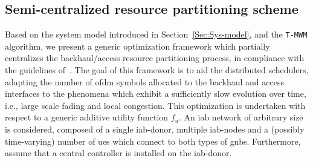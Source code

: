 \subsection{Semi-centralized resource partitioning scheme}
\label{Sec:Cent-scheme}
Based on the system model introduced in Section~\ref{Sec:Sys-model}, and the \texttt{T-MWM} algorithm, we present a generic optimization framework which partially centralizes the backhaul/access resource partitioning process, in compliance with the guidelines of~\cite{3gpp_38_874}. 
The goal of this framework is to aid the distributed schedulers, adapting the number of \gls{ofdm} symbols allocated to the backhaul and access interfaces to the phenomena which exhibit a sufficiently slow evolution over time, i.e., large scale fading and local congestion. %
This optimization is undertaken with respect to a generic additive utility function $f_u$. An \gls{iab} network of arbitrary size is considered, composed of a single \gls{iab}-donor, multiple \gls{iab}-nodes and a (possibly time-varying) number of \glspl{ue} which connect to both types of \glspl{gnb}. %
Furthermore, %
assume that a central controller is installed on the \gls{iab}-donor. 

